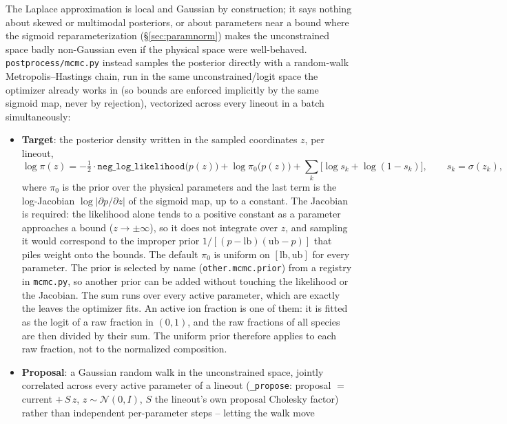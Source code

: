 \documentclass[11pt]{article}
\newcommand{\code}[1]{\texttt{#1}}
\newcommand{\file}[1]{\texttt{#1}}
\begin{document}
The Laplace approximation is local and Gaussian by construction; it says nothing about
skewed or multimodal posteriors, or about parameters near a bound where the sigmoid
reparameterization (\S\ref{sec:paramnorm}) makes the unconstrained space badly
non-Gaussian even if the physical space were well-behaved. \file{postprocess/mcmc.py}
instead samples the posterior directly with a random-walk Metropolis--Hastings chain, run
in the same unconstrained/logit space the optimizer already works in (so bounds are
enforced implicitly by the same sigmoid map, never by rejection), vectorized across every
lineout in a batch simultaneously:
\begin{itemize}
  \item \textbf{Target}: the posterior density written in the sampled coordinates $z$,
    per lineout,
    \begin{equation}\label{eq:mcmc-target}
      \log\pi(z)=-\tfrac12\cdot\code{neg\_log\_likelihood}\big(p(z)\big)+\log\pi_0\big(p(z)\big)
      +\sum_k\big[\log s_k+\log(1-s_k)\big],\qquad s_k=\sigma(z_k),
    \end{equation}
    where $\pi_0$ is the prior over the physical parameters and the last term is the
    log-Jacobian $\log\vert\partial p/\partial z\vert$ of the sigmoid map, up to a
    constant. The Jacobian is required: the likelihood alone tends to a positive constant
    as a parameter approaches a bound ($z\to\pm\infty$), so it does not integrate over
    $z$, and sampling it would correspond to the improper prior
    $1/[(p-\mathrm{lb})(\mathrm{ub}-p)]$ that piles weight onto the bounds. The default
    $\pi_0$ is uniform on $[\mathrm{lb},\mathrm{ub}]$ for every parameter. The prior is
    selected by name (\code{other.mcmc.prior}) from a registry in \file{mcmc.py}, so
    another prior can be added without touching the likelihood or the Jacobian. The sum
    runs over every active parameter, which are exactly the leaves the optimizer fits. An
    active ion fraction is one of them: it is fitted as the logit of a raw fraction in
    $(0,1)$, and the raw fractions of all species are then divided by their sum. The
    uniform prior therefore applies to each raw fraction, not to the normalized
    composition.
  \item \textbf{Proposal}: a Gaussian random walk in the unconstrained space, jointly
    correlated across every active parameter of a lineout (\code{\_propose}: proposal
    $=$ current $+\,S\,z$, $z\sim\mathcal N(0,I)$, $S$ the lineout's own proposal Cholesky
    factor) rather than independent per-parameter steps -- letting the walk move

\end{itemize}
\end{document}
